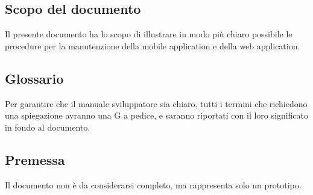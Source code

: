 \documentclass[../manuale-manutentore.tex]{subfiles}
\begin{document}
\subsection{Scopo del documento}%
\label{sub:scopo_del_documento}
Il presente documento ha lo scopo di illustrare in modo più chiaro possibile le procedure per la manutenzione della mobile application e della web application.

\subsection{Glossario}%
\label{sub:glossario}
Per garantire che il manuale sviluppatore sia chiaro, tutti i termini che richiedono una spiegazione avranno una G a pedice, e saranno riportati con il loro significato in fondo al documento.

\subsection{Premessa}%
\label{sub:premessa}
Il documento non è da considerarsi completo, ma rappresenta solo un prototipo.
\end{document}
